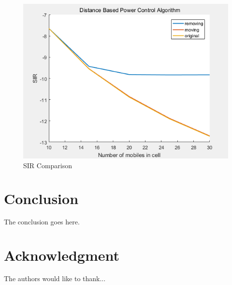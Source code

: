 \documentclass[conference]{IEEEtran}
\begin{document}
 
\begin{figure}[th]
	\centering
	\includegraphics[width=0.65\linewidth]{"performance compared with SRA"}
	\caption{SIR Comparison}
	\label{fig:performance-compared-with-sra}
\end{figure}









\section{Conclusion}
The conclusion goes here.





\section*{Acknowledgment}


The authors would like to thank...






\end{document}
